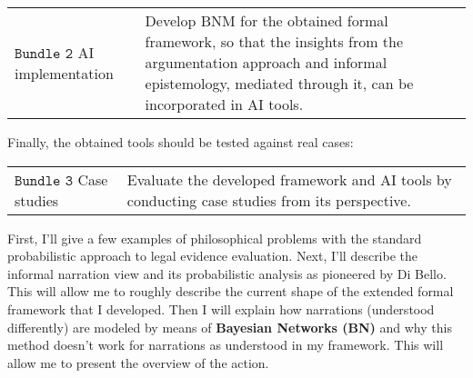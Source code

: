 \documentclass[11pt, a4paper]{article}
\begin{document}
\vspace{-1mm}


\begin{center}
\begin{tabular}{p{2.3cm}|p{13.2cm}}
\footnotesize \textbf{$\mathtt{Bundle \,\, 2}$} \newline  \tiny AI implementation 
 & Develop BNM for the obtained formal framework, so that the insights from the argumentation approach and informal epistemology, mediated through it, can be incorporated in AI tools.
\end{tabular}
\end{center}


\vspace{-3mm}


\noindent Finally, the obtained tools should be tested against real cases:

\vspace{-3mm}


\begin{center}
\begin{tabular}{p{2.3cm}|p{13.2cm}}
\footnotesize \textbf{$\mathtt{Bundle \,\, 3}$} \newline  \tiny    Case studies & 
Evaluate the developed framework and AI tools  by conducting case studies from its perspective.  
\end{tabular}
\end{center}

\vspace{-3mm}


First, I'll give a few examples of philosophical problems with the standard probabilistic approach to legal evidence evaluation. Next, I'll describe the informal narration view and its \linebreak probabilistic analysis as pioneered by  Di Bello. This will allow me to roughly describe the current shape of the extended formal framework that I developed. Then I will explain how narrations (understood differently) are modeled by means of \textbf{Bayesian Networks (BN)} and why this method doesn't work for narrations as understood in my framework. This will allow me to present the overview of the action.







\end{document}
